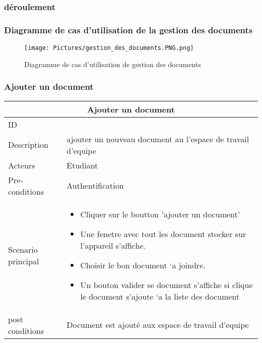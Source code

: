 \documentclass[11pt,fleqn]{book} %
\begin{document}
\subsubsection{déroulement}


\subsubsection{Diagramme de cas d’utilisation de la gestion 
des documents}
\begin{figure}[h]
    \centering
    \texttt{[image: Pictures/gestion\_des\_documents.PNG.png]}
    \caption{Diagramme de cas d'utilisation de gestion des documents}
    \label{fig:pca}
\end{figure}
\subsubsection{Ajouter un document}
\begin{center}
\begin{tabularx}{1\textwidth} { | p{4cm} | >{\raggedright\arraybackslash}X |  }
  \hline
  \multicolumn{2}{|c|}{Ajouter un document} \\
 \hline
 ID & 1  \\
 \hline
 Description  & ajouter un nouveau document au l'espace de travail d'equipe \\
  \hline
 Acteurs  & Etudiant   \\
  \hline
 Pre-conditions  & Authentification\\
 \hline
 Scenario principal  &  
 \begin{itemize}
     \item Cliquer sur le boutton ’ajouter un document' 
     \item Une fenetre avec tout les document stocker sur l’appareil s’affiche.
     \item Choisir le bon document `a joindre.
     \item Un bouton valider se document s’affiche si clique le document s’ajoute `a la liste des document

 \end{itemize}\\
  \hline
 post conditions  &  Document est ajouté aux espace de travail d'equipe  \\
  \hline
\end{tabularx}
\label{tbl:nicetablelesstable}
\end{center}
\end{document}
